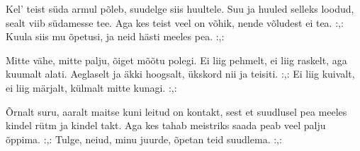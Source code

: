 Kel' teist s\"uda armul p\~oleb,
suudelge siis huultele.
Suu ja huuled selleks loodud,
sealt viib s\"udamesse tee.
Aga kes teist veel on v\~ohik,
nende v\~oludest ei tea.
:,: Kuula siis mu \~opetusi,
    ja neid h\"asti meeles pea. :,:

Mitte v\"ahe, mitte palju,
\~oiget m\~o\~otu polegi.
Ei liig pehmelt, ei liig raskelt,
aga kuumalt alati.
Aeglaselt ja \"akki hoogsalt,
\"ukskord nii ja teisiti.
:,: Ei liig kuivalt, ei liig m\"arjalt,
    k\"ulmalt mitte kunagi. :,:

\~Ornalt suru, aaralt maitse
kuni leitud on kontakt,
sest et suudlusel pea meeles
kindel r\"utm ja kindel takt.
Aga kes tahab meistriks saada
peab veel palju \~oppima.
:,: Tulge, neiud, minu juurde,
    \~opetan teid suudlema. :,: